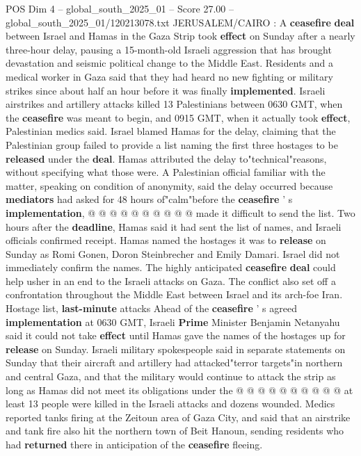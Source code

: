 \begin{textsample}{POS Dim 4 – global\_south\_2025\_01 – Score 27.00 – global\_south\_2025\_01/120213078.txt}  \label{ex:f4_pos_012}
JERUSALEM/CAIRO : A \textbf{ceasefire} \textbf{deal} between Israel and Hamas in the Gaza Strip took \textbf{effect} on Sunday after a nearly three-hour delay, pausing a 15-month-old Israeli aggression that has brought devastation and seismic political change to the Middle East.
Residents and a medical worker in Gaza said that they had heard no new fighting or military strikes since about half an hour before it was finally \textbf{implemented}.
Israeli airstrikes and artillery attacks killed 13 Palestinians between 0630 GMT, when the \textbf{ceasefire} was meant to begin, and 0915 GMT, when it actually took \textbf{effect}, Palestinian medics said.
Israel blamed Hamas for the delay, claiming that the Palestinian group failed to provide a list naming the first three hostages to be \textbf{released} under the \textbf{deal}.
Hamas attributed the delay to"technical"reasons, without specifying what those were.
A Palestinian official familiar with the matter, speaking on condition of anonymity, said the delay occurred because \textbf{mediators} had asked for 48 hours of"calm"before the \textbf{ceasefire} ' s \textbf{implementation}, @ @ @ @ @ @ @ @ @ @ made it difficult to send the list.
Two hours after the \textbf{deadline}, Hamas said it had sent the list of names, and Israeli officials confirmed receipt.
Hamas named the hostages it was to \textbf{release} on Sunday as Romi Gonen, Doron Steinbrecher and Emily Damari.
Israel did not immediately confirm the names.
The highly anticipated \textbf{ceasefire} \textbf{deal} could help usher in an end to the Israeli attacks on Gaza.
The conflict also set off a confrontation throughout the Middle East between Israel and its arch-foe Iran.
Hostage list, \textbf{last-minute} attacks Ahead of the \textbf{ceasefire} ' s agreed \textbf{implementation} at 0630 GMT, Israeli \textbf{Prime} Minister Benjamin Netanyahu said it could not take \textbf{effect} until Hamas gave the names of the hostages up for \textbf{release} on Sunday.
Israeli military spokespeople said in separate statements on Sunday that their aircraft and artillery had attacked"terror targets"in northern and central Gaza, and that the military would continue to attack the strip as long as Hamas did not meet its obligations under the @ @ @ @ @ @ @ @ @ @ at least 13 people were killed in the Israeli attacks and dozens wounded.
Medics reported tanks firing at the Zeitoun area of Gaza City, and said that an airstrike and tank fire also hit the northern town of Beit Hanoun, sending residents who had \textbf{returned} there in anticipation of the \textbf{ceasefire} fleeing.

\end{textsample}
